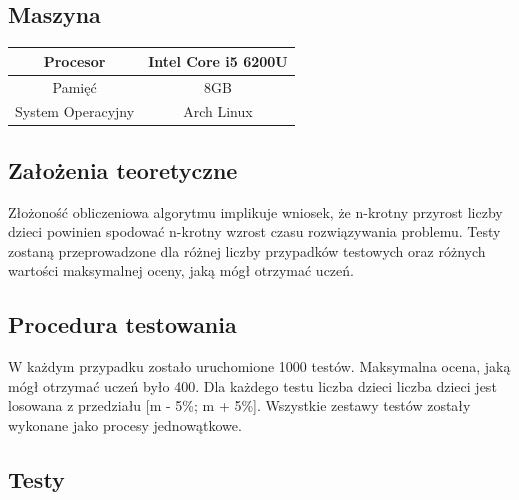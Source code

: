 \documentclass{article}
\begin{document}
	\subsection{Maszyna}
	\begin{center}
		\begin{tabular}{c c}
			\toprule
			Procesor & Intel Core i5 6200U \\
			\midrule
			Pamięć & 8GB \\
			\midrule
			System Operacyjny & Arch Linux\\
			\bottomrule
		\end{tabular}
	\end{center}

	\subsection{Założenia teoretyczne}
	Złożoność obliczeniowa algorytmu implikuje wniosek, że n-krotny przyrost liczby dzieci powinien spodować n-krotny wzrost czasu rozwiązywania problemu. Testy zostaną przeprowadzone dla różnej liczby przypadków testowych oraz różnych wartości maksymalnej oceny, jaką mógł otrzymać uczeń.

	\subsection{Procedura testowania}
	W każdym przypadku zostało uruchomione 1000 testów. Maksymalna ocena, jaką mógł otrzymać uczeń było 400.
	Dla każdego testu liczba dzieci liczba dzieci jest losowana z przedziału [m - 5\%; m + 5\%].
	Wszystkie zestawy testów zostały wykonane jako procesy jednowątkowe.


	\subsection{Testy}
\end{document}
